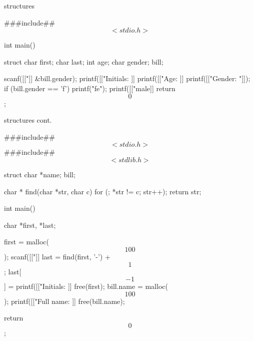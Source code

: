 \documentclass[10pt,t,svgnames]{beamer}
\begin{document}
  \begin{frame}[fragile]{structures}
    \begin{scriptsize}
      \begin{codeblock}[gobble=2]
        ###include## $$<stdio.h>$$

        int main() {
          struct {
            char first;
            char last;
            int age;
            char gender;
          } bill;

          scanf([["]]%
            &bill.gender);
          printf([["Initials: ]]%
          printf([["Age: ]]%
          printf([["Gender: "]]);
          if (bill.gender == 'f') {
            printf("fe");
          }
          printf([["male]]%
          return $$0$$;
        }
      \end{codeblock}
    \end{scriptsize}
  \end{frame}

  \begin{frame}[fragile]{structures cont.}
    \begin{scriptsize}
      \begin{codeblock}[gobble=2]
        ###include## $$<stdio.h>$$
        ###include## $$<stdlib.h>$$

        struct { char *name; } bill;

        char * find(char *str, char c) {
          for (; *str != c; str++);
          return str;
        }

        int main() {
          char *first, *last;

          first = malloc($$100$$);
          scanf([["]]%
          last = find(first, '-') + $$1$$;
          last[$$-1$$] = %
          printf([["Initials: ]]%
          free(first);
          bill.name = malloc($$100$$);
          printf([["Full name: ]]%
          free(bill.name);

          return $$0$$;
        }
      \end{codeblock}
    \end{scriptsize}
  \end{frame}
\end{document}
